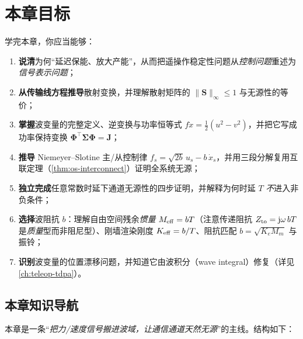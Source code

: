 \section*{本章目标}
学完本章，你应当能够：
\begin{enumerate}
  \item \textbf{说清}为何“延迟保能、放大产能”，从而把遥操作稳定性问题从\emph{控制问题}重述为\emph{信号表示问题}；
  \item \textbf{从传输线方程推导}散射变换，并理解散射矩阵的 $\|\mathbf S\|_\infty\le1$ 与无源性的等价；
  \item \textbf{掌握}波变量的完整定义、逆变换与功率恒等式 $f\dot x=\tfrac12(u^2-v^2)$，并把它写成功率保持变换 $\boldsymbol\Phi^\top\boldsymbol\Sigma\boldsymbol\Phi=\mathbf J$；
  \item \textbf{推导} Niemeyer--Slotine 主/从控制律 $f_s=\sqrt{2b}\,u_s-b\,\dot x_s$，并用三段分解复用互联定理（\cref{thm:os-interconnect}）证明全系统无源；
  \item \textbf{独立完成}任意常数时延下通道无源性的四步证明，并解释为何时延 $T$ \emph{不}进入非负条件；
  \item \textbf{选择}波阻抗 $b$：理解自由空间残余\emph{惯量} $M_{\rm eff}=bT$（注意传递阻抗 $Z_{\rm to}=\mathrm j\omega\,bT$ 是\emph{质量}型而非阻尼型）、刚墙渲染刚度 $K_{\rm eff}=b/T$、阻抗匹配 $b=\sqrt{K_eM_m}$ 与振铃；
  \item \textbf{识别}波变量的位置漂移问题，并知道它由波积分（wave integral）修复（详见 \cref{ch:teleop-tdpa}）。
\end{enumerate}

\subsection*{本章知识导航}
本章是一条“\emph{把力/速度信号搬进波域，让通信通道天然无源}”的主线。结构如下：

